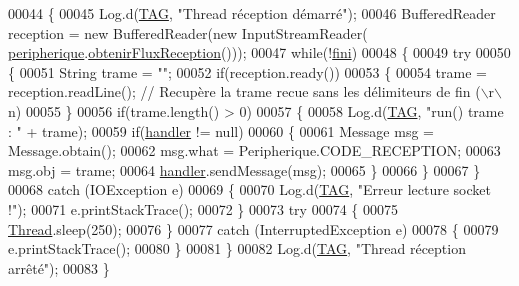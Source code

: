 \begin{DoxyCode}
00044     \{
00045         Log.d(\hyperlink{classcom_1_1example_1_1ekawa_1_1_reception_a4e155d4690591616f1064e17764df72b}{TAG}, \textcolor{stringliteral}{"Thread réception démarré"});
00046         BufferedReader reception = \textcolor{keyword}{new} BufferedReader(\textcolor{keyword}{new} InputStreamReader(
      \hyperlink{classcom_1_1example_1_1ekawa_1_1_reception_a9f41511c4449d90da78017ca698367ef}{peripherique}.\hyperlink{classcom_1_1example_1_1ekawa_1_1_peripherique_a8b88d0a0d9e0c1b1aae04ba7c9d24619}{obtenirFluxReception}()));
00047         \textcolor{keywordflow}{while}(!\hyperlink{classcom_1_1example_1_1ekawa_1_1_reception_a10e50f0a5152056cf0c79c53bfa01cc9}{fini})
00048         \{
00049             \textcolor{keywordflow}{try}
00050             \{
00051                 String trame = \textcolor{stringliteral}{""};
00052                 \textcolor{keywordflow}{if}(reception.ready())
00053                 \{
00054                     trame = reception.readLine(); \textcolor{comment}{// Recupère la trame recue sans les délimiteurs de fin
       (\(\backslash\)r\(\backslash\)n)}
00055                 \}
00056                 \textcolor{keywordflow}{if}(trame.length() > 0)
00057                 \{
00058                     Log.d(\hyperlink{classcom_1_1example_1_1ekawa_1_1_reception_a4e155d4690591616f1064e17764df72b}{TAG}, \textcolor{stringliteral}{"run() trame : "} + trame);
00059                     \textcolor{keywordflow}{if}(\hyperlink{classcom_1_1example_1_1ekawa_1_1_reception_ab6273fbebb5aca17b9f95e275f1d3d38}{handler} != null)
00060                     \{
00061                         Message msg = Message.obtain();
00062                         msg.what = Peripherique.CODE\_RECEPTION;
00063                         msg.obj = trame;
00064                         \hyperlink{classcom_1_1example_1_1ekawa_1_1_reception_ab6273fbebb5aca17b9f95e275f1d3d38}{handler}.sendMessage(msg);
00065                     \}
00066                 \}
00067             \}
00068             \textcolor{keywordflow}{catch} (IOException e)
00069             \{
00070                 Log.d(\hyperlink{classcom_1_1example_1_1ekawa_1_1_reception_a4e155d4690591616f1064e17764df72b}{TAG}, \textcolor{stringliteral}{"Erreur lecture socket !"});
00071                  e.printStackTrace();
00072             \}
00073             \textcolor{keywordflow}{try}
00074             \{
00075                 \hyperlink{class_thread}{Thread}.sleep(250);
00076             \}
00077             \textcolor{keywordflow}{catch} (InterruptedException e)
00078             \{
00079                 e.printStackTrace();
00080             \}
00081         \}
00082         Log.d(\hyperlink{classcom_1_1example_1_1ekawa_1_1_reception_a4e155d4690591616f1064e17764df72b}{TAG}, \textcolor{stringliteral}{"Thread réception arrêté"});
00083     \}
\end{DoxyCode}


